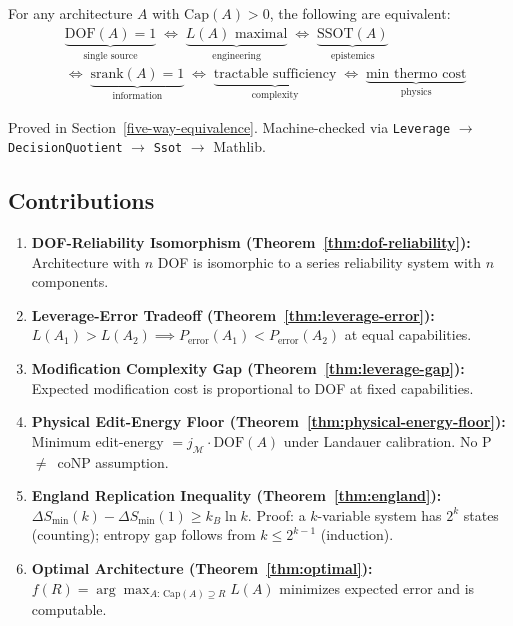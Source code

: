 \begin{theorem}\label{thm:five-way}
For any architecture $A$ with $\mathrm{Cap}(A) > 0$, the following are equivalent:
\[
\begin{aligned}
&\underbrace{\mathrm{DOF}(A) = 1}_{\text{single source}}
\;\iff\;
\underbrace{L(A) \text{ maximal}}_{\text{engineering}}
\;\iff\;
\underbrace{\mathrm{SSOT}(A)}_{\text{epistemics}} \\
&\iff\;
\underbrace{\mathrm{srank}(A) = 1}_{\text{information}}
\;\iff\;
\underbrace{\text{tractable sufficiency}}_{\text{complexity}}
\;\iff\;
\underbrace{\text{min thermo cost}}_{\text{physics}}
\end{aligned}
\]
\end{theorem}

Proved in Section~\ref{five-way-equivalence}. Machine-checked via \texttt{Leverage} $\to$ \texttt{DecisionQuotient} $\to$ \texttt{Ssot} $\to$ Mathlib.

\subsection{Contributions}

\begin{enumerate}
\item \textbf{DOF-Reliability Isomorphism (Theorem~\ref{thm:dof-reliability}):} Architecture with $n$ DOF is isomorphic to a series reliability system with $n$ components.

\item \textbf{Leverage-Error Tradeoff (Theorem~\ref{thm:leverage-error}):} $L(A_1) > L(A_2) \implies P_{\mathrm{error}}(A_1) < P_{\mathrm{error}}(A_2)$ at equal capabilities.

\item \textbf{Modification Complexity Gap (Theorem~\ref{thm:leverage-gap}):} Expected modification cost is proportional to DOF at fixed capabilities.

\item \textbf{Physical Edit-Energy Floor (Theorem~\ref{thm:physical-energy-floor}):} Minimum edit-energy $= j_\mathcal{M} \cdot \mathrm{DOF}(A)$ under Landauer calibration. No P~$\neq$~coNP assumption. 

\item \textbf{England Replication Inequality (Theorem~\ref{thm:england}):} $\Delta S_{\min}(k) - \Delta S_{\min}(1) \geq k_B \ln k$. Proof: a $k$-variable system has $2^k$ states (counting); entropy gap follows from $k \leq 2^{k-1}$ (induction). 

\item \textbf{Optimal Architecture (Theorem~\ref{thm:optimal}):} $f(R) = \arg\max_{A:\,\mathrm{Cap}(A) \supseteq R} L(A)$ minimizes expected error and is computable.
\end{enumerate}

